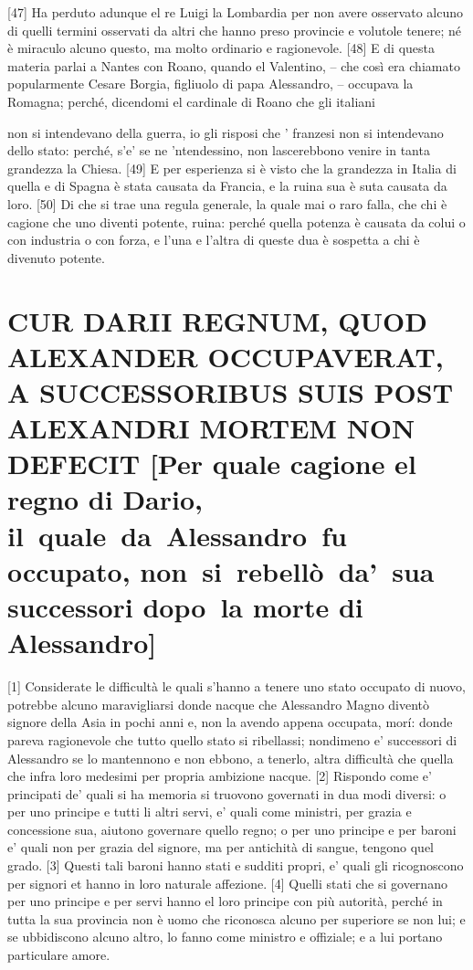 {[}47{]} Ha perduto adunque el re Luigi la Lombardia per non avere
osservato alcuno di quelli termini osservati da altri che hanno preso
provincie e volutole tenere; né è miraculo alcuno questo, ma molto
ordinario e ragionevole. {[}48{]} E di questa materia parlai a Nantes
con Roano, quando el Valentino, -- che così era chiamato popularmente
Cesare Borgia, figliuolo di papa Alessandro, -- occupava la Romagna;
perché, dicendomi el cardinale di Roano che gli italiani \linebreak

\quebra

\noindent{}non si
intendevano della guerra, io gli risposi che ' franzesi non si
intendevano dello stato: perché, s'e' se ne 'ntendessino, non
lascerebbono venire in tanta grandezza la Chiesa. {[}49{]} E per
esperienza si è visto che la grandezza in Italia di quella e di Spagna è
stata causata da Francia, e la ruina sua è suta causata da loro.
{[}50{]} Di che si trae una regula generale, la quale mai o raro falla,
che chi è cagione che uno diventi potente, ruina: perché quella potenza
è causata da colui o con industria o con forza, e l'una e l'altra di
queste dua è sospetta a chi è divenuto potente.

\quebra\section{CUR DARII REGNUM, QUOD ALEXANDER OCCUPAVERAT, A SUCCESSORIBUS SUIS POST
ALEXANDRI MORTEM NON DEFECIT\break
{[}Per quale cagione el regno di Dario, il~quale~da~Alessandro~fu
occupato, non~si~rebellò~da'~sua successori dopo~la morte di
Alessandro{]}}

{[}1{]} Considerate le difficultà le quali s'hanno a tenere uno stato
occupato di nuovo, potrebbe alcuno maravigliarsi donde nacque che
Alessandro Magno diventò signore della Asia in pochi anni e, non la
avendo appena occupata, morí: donde pareva ragionevole che tutto quello
stato si ribellassi; nondimeno e' successori di Alessandro se lo
mantennono e non ebbono, a tenerlo, altra difficultà che quella che
infra loro medesimi per propria ambizione nacque. {[}2{]} Rispondo come
e' principati de' quali si ha memoria si truovono governati in dua modi
diversi: o per uno principe e tutti li altri servi, e' quali come
ministri, per grazia e concessione sua, aiutono governare quello regno;
o per uno principe e per baroni e' quali non per grazia del signore, ma
per antichità di sangue, tengono quel grado. {[}3{]} Questi tali baroni
hanno stati e sudditi propri, e' quali gli ricognoscono per signori et
hanno in loro naturale affezione. {[}4{]} Quelli stati che si governano
per uno principe e per servi hanno el loro principe con più autorità,
perché in tutta la sua provincia non è uomo che riconosca alcuno per
superiore se non lui; e se ubbidiscono alcuno altro, lo fanno come ministro e offiziale; e a lui portano particulare amore.

